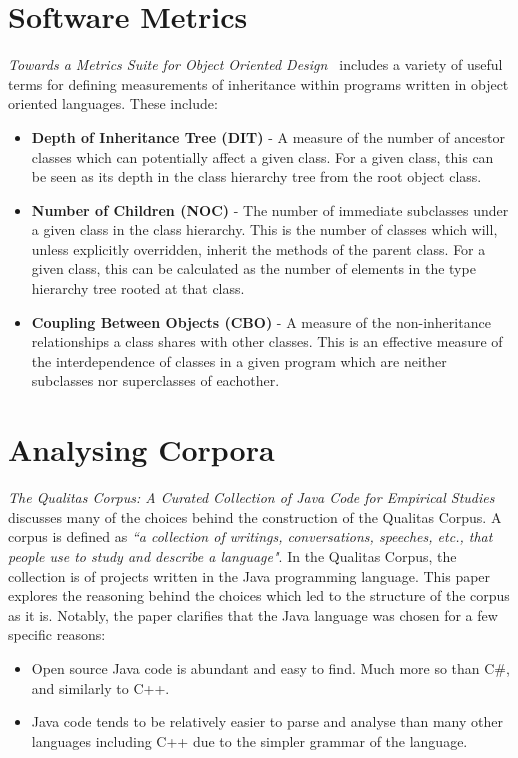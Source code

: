 \section{Software Metrics}
\textit{Towards a Metrics Suite for Object Oriented Design~\cite{MetricsSuite}} includes a variety of useful terms for defining measurements of inheritance within programs written in object oriented languages. These include:
\begin{itemize}
	\item \textbf{Depth of Inheritance Tree (DIT)} - A measure of the number of ancestor classes which can potentially affect a given class. For a given class, this can be seen as its depth in the class hierarchy tree from the root object class.
	\item \textbf{Number of Children (NOC)} - The number of immediate subclasses under a given class in the class hierarchy. This is the number of classes which will, unless explicitly overridden, inherit the methods of the parent class. For a given class, this can be calculated as the number of elements in the type hierarchy tree rooted at that class.
	\item \textbf{Coupling Between Objects (CBO)} - A measure of the non-inheritance relationships a class shares with other classes. This is an effective measure of the interdependence of classes in a given program which are neither subclasses nor superclasses of eachother.
	\newline
\end{itemize}

\section{Analysing Corpora}
\textit{The Qualitas Corpus: A Curated Collection of Java Code for Empirical Studies~\cite{QualitasCorpus}} discusses many of the choices behind the construction of the Qualitas Corpus. A corpus is defined as \textit{``a collection of writings, conversations, speeches, etc., that people use to study and describe a language"}. In the Qualitas Corpus, the collection is of projects written in the Java programming language. This paper explores the reasoning behind the choices which led to the structure of the corpus as it is. Notably, the paper clarifies that the Java language was chosen for a few specific reasons:
\begin{itemize}
	\item Open source Java code is abundant and easy to find. Much more so than C\#, and similarly to C++.
	\item Java code tends to be relatively easier to parse and analyse than many other languages including C++ due to the simpler grammar of the language.\newline
\end{itemize}

